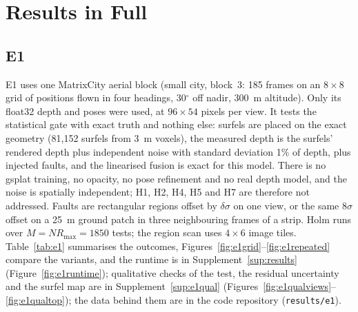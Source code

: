 \section{Results in Full}
\label{sup:fullresults}
\subsection{E1}
\label{sup:e1full}
E1 uses one MatrixCity aerial block \cite{data_matrixcity} (small city, block~3: 185 frames on an
$8\times8$ grid of positions flown in four headings, 30$^{\circ}$ off nadir, 300~m altitude). Only its
float32 depth and poses were used, at $96\times54$ pixels per view. It tests the statistical gate with
exact truth and nothing else: surfels are placed on the exact geometry (81{,}152 surfels from 3~m voxels),
the measured depth is the surfels' rendered depth plus independent noise with standard deviation 1\%
of depth, plus injected faults, and the linearised fusion is exact for this model. There is no gsplat
training, no opacity, no pose refinement and no real depth model, and the noise is spatially
independent; H1, H2, H4, H5 and H7 are therefore not addressed. Faults are rectangular regions offset
by $\delta\sigma$ on one view, or the same $8\sigma$ offset on a 25~m ground patch in three neighbouring
frames of a strip. Holm runs over $M=NR_{\max}=1850$ tests; the region scan uses $4\times6$ image tiles.
Table~\ref{tab:e1} summarises the outcomes, Figures~\ref{fig:e1grid}--\ref{fig:e1repeated} compare
the variants, and the runtime is in Supplement~\ref{sup:results} (Figure~\ref{fig:e1runtime}); qualitative
checks of the test, the residual uncertainty and the surfel map are in Supplement~\ref{sup:e1qual}
(Figures~\ref{fig:e1qualviews}--\ref{fig:e1qualtop}); the data behind them are in the code repository
(\texttt{results/e1}).

